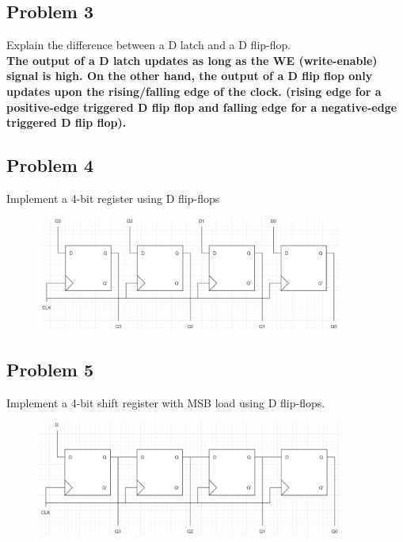 \documentclass{article}
\begin{document}
\subsection*{Problem 3}
Explain the difference between a D latch and a D flip-flop.
\\ \textbf{The output of a D latch updates as long as the WE (write-enable) signal is high. On the other hand, the output of a D flip flop only updates upon the rising/falling edge of the clock. (rising edge for a positive-edge triggered D flip flop and falling edge for a negative-edge triggered D flip flop).}

\subsection*{Problem 4}
Implement a 4-bit register using D flip-flops
\begin{figure}[!h]
    \centering
    \includegraphics[width=0.9\textwidth]{figures/latch4_solution.png}
\end{figure}

\subsection*{Problem 5}
Implement a 4-bit shift register with MSB load using D flip-flops.
\begin{figure}[!h]
    \centering
    \includegraphics[width=0.9\textwidth]{figures/latch5_solution.png}
\end{figure}
\end{document}

